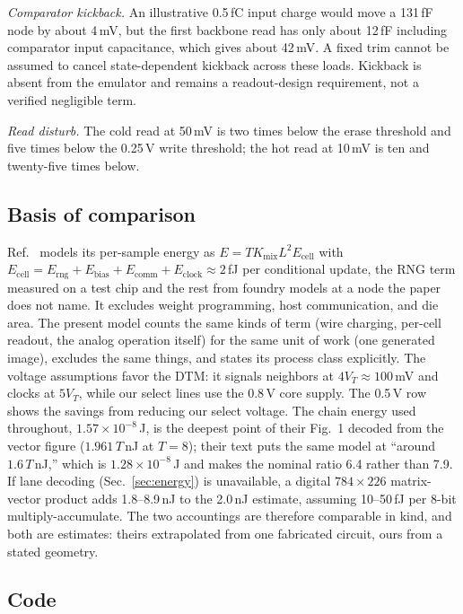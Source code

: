 \documentclass[reprint,amsmath,amssymb,aps,nofootinbib]{revtex4-2}
\begin{document}
\emph{Comparator kickback.} An illustrative 0.5\,fC input charge
would move a 131\,fF node by about 4\,mV, but the first backbone
read has only about 12\,fF including comparator input capacitance,
which gives about 42\,mV. A fixed trim cannot be assumed to cancel
state-dependent kickback across these loads. Kickback is absent from
the emulator and remains a readout-design requirement, not a verified
negligible term.

\emph{Read disturb.} The cold read at 50\,mV is two times below the
erase threshold and five times below the 0.25\,V write threshold; the
hot read at 10\,mV is ten and twenty-five times below.

\subsection{Basis of comparison}\label{app:basis}

Ref.~\cite{jelincic2025dtm} models its per-sample energy as $E = T
K_{\mathrm{mix}} L^2 E_{\mathrm{cell}}$ with $E_{\mathrm{cell}} =
E_{\mathrm{rng}} + E_{\mathrm{bias}} + E_{\mathrm{comm}} +
E_{\mathrm{clock}} \approx 2$\,fJ per conditional update, the RNG term
measured on a test chip and the rest from foundry models at a node the
paper does not name. It excludes weight programming, host
communication, and die area. The present model counts the same kinds of
term (wire charging, per-cell readout, the analog operation itself) for
the same unit of work (one generated image), excludes the same things,
and states its process class explicitly. The voltage assumptions favor the DTM: it signals neighbors at $4 V_T
\approx 100$\,mV and clocks at $5 V_T$, while our select lines use the
0.8\,V core supply. The 0.5\,V row shows the savings from reducing our
select voltage. The chain energy used throughout,
$1.57\times10^{-8}$\,J, is the deepest point of their Fig.~1 decoded
from the vector figure ($1.961\,T$\,nJ at $T = 8$); their text puts
the same model at ``around $1.6\,T$\,nJ,'' which is
$1.28\times10^{-8}$\,J and makes the nominal ratio 6.4 rather than
7.9. If lane decoding (Sec.~\ref{sec:energy}) is unavailable, a digital $784
\times 226$ matrix-vector product adds 1.8--8.9\,nJ to the 2.0\,nJ
estimate, assuming 10--50\,fJ per 8-bit multiply-accumulate. The two accountings are
therefore comparable in kind, and both
are estimates: theirs extrapolated from one fabricated circuit, ours
from a stated geometry.

\subsection{Code}\label{app:code}
\end{document}
